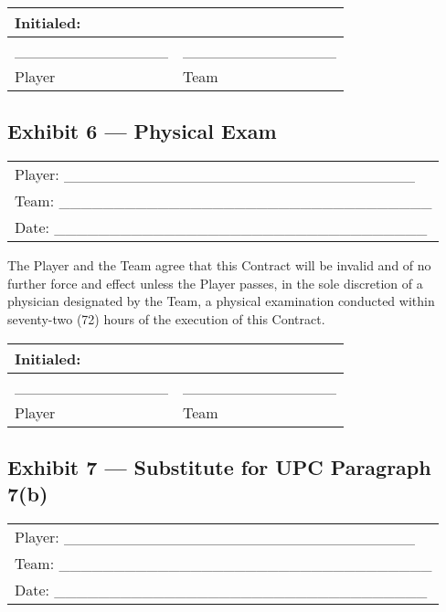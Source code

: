 \documentclass[
]{book}
\begin{document}
\begin{longtable}[]{@{}ll@{}}
\toprule()
Initialed: & \\
\midrule()
\endhead
\_\_\_\_\_\_\_\_\_\_\_\_\_\_ & \_\_\_\_\_\_\_\_\_\_\_\_\_\_ \\
Player & Team \\
\bottomrule()
\end{longtable}

\newpage

\hypertarget{exhibit-6-physical-exam}{%
\subsection{Exhibit 6 --- Physical Exam}\label{exhibit-6-physical-exam}}

\begin{longtable}[]{@{}l@{}}
\toprule()
\endhead
Player: \_\_\_\_\_\_\_\_\_\_\_\_\_\_\_\_\_\_\_\_\_\_\_\_\_\_\_\_\_\_\_\_ \\
Team: \_\_\_\_\_\_\_\_\_\_\_\_\_\_\_\_\_\_\_\_\_\_\_\_\_\_\_\_\_\_\_\_\_\_ \\
Date: \_\_\_\_\_\_\_\_\_\_\_\_\_\_\_\_\_\_\_\_\_\_\_\_\_\_\_\_\_\_\_\_\_\_ \\
\bottomrule()
\end{longtable}

The Player and the Team agree that this Contract will be invalid and of no further force and effect unless the Player passes, in the sole discretion of a physician designated by the Team, a physical examination conducted within seventy-two (72) hours of the execution of this Contract.

\begin{longtable}[]{@{}ll@{}}
\toprule()
Initialed: & \\
\midrule()
\endhead
\_\_\_\_\_\_\_\_\_\_\_\_\_\_ & \_\_\_\_\_\_\_\_\_\_\_\_\_\_ \\
Player & Team \\
\bottomrule()
\end{longtable}

\newpage

\hypertarget{exhibit-7-substitute-for-upc-paragraph-7b}{%
\subsection{Exhibit 7 --- Substitute for UPC Paragraph 7(b)}\label{exhibit-7-substitute-for-upc-paragraph-7b}}

\begin{longtable}[]{@{}l@{}}
\toprule()
\endhead
Player: \_\_\_\_\_\_\_\_\_\_\_\_\_\_\_\_\_\_\_\_\_\_\_\_\_\_\_\_\_\_\_\_ \\
Team: \_\_\_\_\_\_\_\_\_\_\_\_\_\_\_\_\_\_\_\_\_\_\_\_\_\_\_\_\_\_\_\_\_\_ \\
Date: \_\_\_\_\_\_\_\_\_\_\_\_\_\_\_\_\_\_\_\_\_\_\_\_\_\_\_\_\_\_\_\_\_\_ \\
\bottomrule()
\end{longtable}
\end{document}
